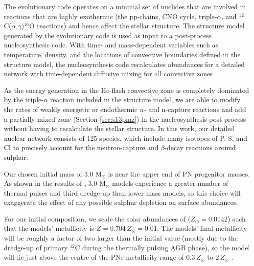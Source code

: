 The evolutionary code operates on a minimal set of nuclides that are involved in reactions that are highly exothermic (the pp-chains, CNO cycle, triple-$\alpha$, and $^{12}$C($\alpha$,$\gamma$)$^{16}$O reactions) and hence affect the stellar structure. The structure model generated by the evolutionary code is used as input to a post-process nucleosynthesis code. With time- and mass-dependent variables such as temperature, density, and the locations of convective boundaries defined in the structure model, the nucleosynthesis code recalculates abundances for a detailed network with time-dependent diffusive mixing for all convective zones \citep{Cannon:1993te}. 

As the energy generation in the He-flash convective zone is completely dominated by the triple-$\alpha$ reaction included in the structure model, we are able to modify the rates of weakly energetic or endothermic $\alpha$- and n-capture reactions and add a partially mixed zone (Section \ref{sec:s13pmz}) in the nucleosynthesis post-process without having to recalculate the stellar structure. In this work, our detailed nuclear network consists of 125 species, which include many isotopes of P, S, and Cl to precisely account for the neutron-capture and $\beta$-decay reactions around sulphur.

Our chosen initial mass of 3.0 M$_\odot$ is near the upper end of PN progenitor masses. As shown in the results of \citet{Karakas:2007gn}, 3.0 M$_\odot$ models experience a greater number of thermal pulses and third dredge-up than lower mass models, so this choice will exaggerate the effect of any possible sulphur depletion on surface abundances.

For our initial composition, we scale the solar abundances of \citet{Asplund:2009eu} ($Z_\odot=0.0142$) such that the models' metallicity is $Z=0.704\,Z_\odot=0.01$. The models' final metallicity will be roughly a factor of two larger than the initial value (mostly due to the dredge-up of primary $^{12}$C during the thermally pulsing AGB phase), so the model will lie just above the centre of the PNe metallicity range of $0.3\,Z_\odot$ to $2\,Z_\odot$ \citep{Sterling:2008dq}. 

